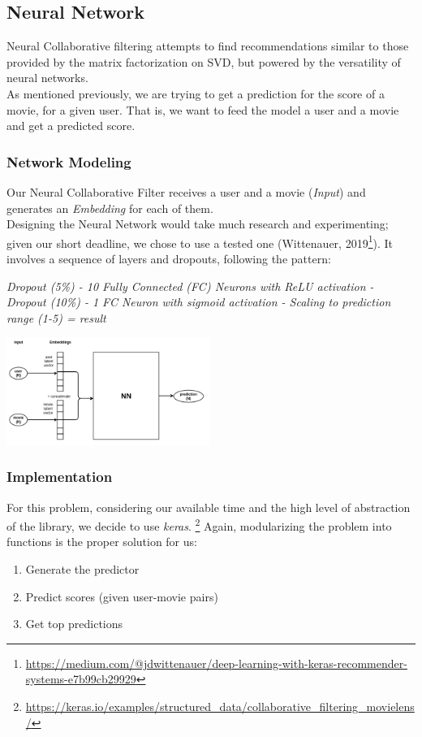 \subsection{Neural Network}
Neural Collaborative filtering attempts to find recommendations similar to those provided by the matrix
factorization on SVD, but powered by the versatility of neural networks.\\
As mentioned previously, we are trying to get a prediction for the score of a movie, for a given user.
That is, we want to feed the model a user and a movie and get a predicted score.\\
\subsubsection*{Network Modeling}
Our Neural Collaborative Filter receives a user and a movie (\emph{Input}) and generates an \emph{Embedding} for each of them.\\
Designing the Neural Network would take much research and experimenting; given our short deadline, we chose to use a tested one
(Wittenauer, 2019\footnote{\href{https://medium.com/@jdwittenauer/deep-learning-with-keras-recommender-systems-e7b99cb29929}{https://medium.com/@jdwittenauer/deep-learning-with-keras-recommender-systems-e7b99cb29929}}).
It involves a sequence of layers and dropouts, following the pattern:
\begin{center}
    \emph{Dropout (5\%) - 10 Fully Connected (FC) Neurons with ReLU activation - Dropout (10\%) - 1 FC Neuron with sigmoid activation - Scaling to prediction range (1-5) = result}\\
\end{center}
\begin{center}
    \captionsetup{type=figure}
    \includegraphics[width=250px]{images/nn-model.png}
\end{center}

\subsubsection*{Implementation}
For this problem, considering our available time and the high level of abstraction of the library, we decide to use \emph{keras}.
\footnote{\href{https://keras.io/examples/structured\_data/collaborative\_filtering\_movielens/}{https://keras.io/examples/structured\_data/collaborative\_filtering\_movielens/}}
Again, modularizing the problem into functions is the proper solution for us:
\begin{enumerate}
    \item Generate the predictor
    \item Predict scores (given user-movie pairs)
    \item Get top predictions
\end{enumerate}

